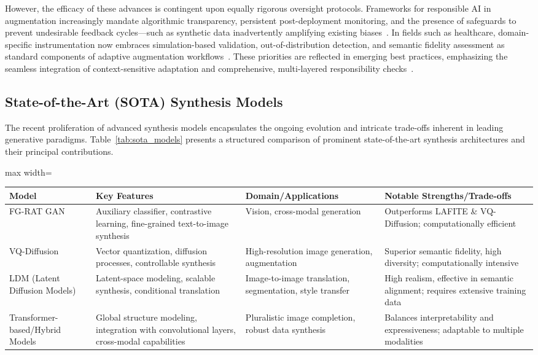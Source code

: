 However, the efficacy of these advances is contingent upon equally rigorous oversight protocols. Frameworks for responsible AI in augmentation increasingly mandate algorithmic transparency, persistent post-deployment monitoring, and the presence of safeguards to prevent undesirable feedback cycles---such as synthetic data inadvertently amplifying existing biases~\cite{ref94,ref95,ref101}. In fields such as healthcare, domain-specific instrumentation now embraces simulation-based validation, out-of-distribution detection, and semantic fidelity assessment as standard components of adaptive augmentation workflows~\cite{ref87,ref101}. These priorities are reflected in emerging best practices, emphasizing the seamless integration of context-sensitive adaptation and comprehensive, multi-layered responsibility checks~\cite{ref94,ref95,ref101}.

\subsection{State-of-the-Art (SOTA) Synthesis Models}

The recent proliferation of advanced synthesis models encapsulates the ongoing evolution and intricate trade-offs inherent in leading generative paradigms. Table~\ref{tab:sota_models} presents a structured comparison of prominent state-of-the-art synthesis architectures and their principal contributions.

\begin{table*}[htbp]
\centering
\caption{Comparison of Select State-of-the-Art Generative Synthesis Models}
\label{tab:sota_models}
\begin{adjustbox}{max width=\textwidth}
\begin{tabular}{llll}
\toprule
\textbf{Model} & \textbf{Key Features} & \textbf{Domain/Applications} & \textbf{Notable Strengths/Trade-offs} \\
\midrule
FG-RAT GAN~\cite{ref87} & Auxiliary classifier, contrastive learning, fine-grained text-to-image synthesis & Vision, cross-modal generation & Outperforms LAFITE \& VQ-Diffusion; computationally efficient \\
VQ-Diffusion~\cite{ref82,ref87} & Vector quantization, diffusion processes, controllable synthesis & High-resolution image generation, augmentation & Superior semantic fidelity, high diversity; computationally intensive \\
LDM (Latent Diffusion Models)~\cite{ref82,ref101} & Latent-space modeling, scalable synthesis, conditional translation & Image-to-image translation, segmentation, style transfer & High realism, effective in semantic alignment; requires extensive training data \\
Transformer-based/Hybrid Models~\cite{ref64,ref81,ref102} & Global structure modeling, integration with convolutional layers, cross-modal capabilities & Pluralistic image completion, robust data synthesis & Balances interpretability and expressiveness; adaptable to multiple modalities \\
\bottomrule
\end{tabular}
\end{adjustbox}
\end{table*}

